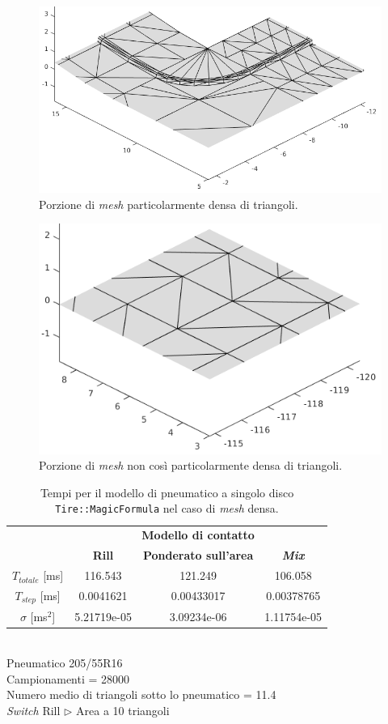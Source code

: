 \begin{figure}
	\centering
	\includegraphics[width=0.6\linewidth]{Figures/mesh_dense}
	\caption{Porzione di \textit{mesh} particolarmente densa di triangoli.}
	\label{meshdense}
\end{figure}
\begin{figure}
	\centering
	\includegraphics[width=0.6\linewidth]{Figures/mesh_notsodense}
	\caption{Porzione di \textit{mesh} non così particolarmente densa di triangoli.}
	\label{meshnotsodense}
\end{figure}
%
\clearpage
%
\begin{table}
	\centering
	\begin{tabular}{c|c|c|c|}
		\cline{2-4} 
		& \multicolumn{3}{c|}{\textbf{Modello di contatto}} \\
		\cline{2-4} 
		& \textbf{Rill} & \textbf{Ponderato sull'area} & \textbf{\textit{Mix}} \\ 
		\hline
		\multicolumn{1}{|c|}{$T_{totale}$ [ms]} & 116.543 & 121.249 & 106.058 \\ 
		\hline 
		\multicolumn{1}{|c|}{$T_{step}$ [ms]} & 0.0041621 & 0.00433017 & 0.00378765 \\ 
		\hline 
		\multicolumn{1}{|c|}{$\sigma$ [ms$^2$]} & 5.21719e-05 & 3.09234e-06 & 1.11754e-05 \\ 
		\hline
	\end{tabular}
	\\[0.5cm]
	Pneumatico 205/55R16\\
	Campionamenti = 28000\\
	Numero medio di triangoli sotto lo pneumatico = 11.4\\
	\textit{Switch} Rill $\triangleright$ Area a 10 triangoli
	\caption{Tempi per il modello di pneumatico a singolo disco \texttt{Tire::MagicFormula} nel caso di \textit{mesh} densa.}
	\label{MFcordolo}
\end{table}
